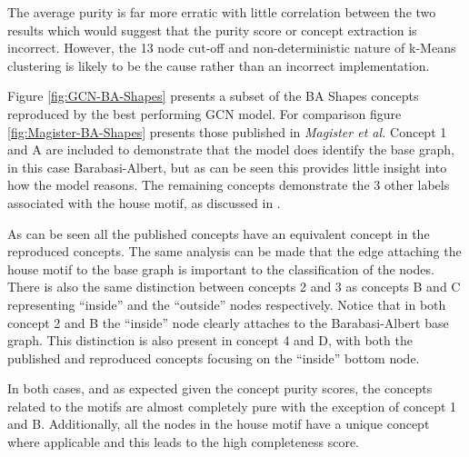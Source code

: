 The average purity is far more erratic with little correlation between the two results which would suggest that the purity score or concept extraction is incorrect.
However, the 13 node cut-off and non-deterministic nature of k-Means clustering is likely to be the cause rather than an incorrect implementation.



Figure \ref{fig:GCN-BA-Shapes} presents a subset of the BA Shapes concepts reproduced by the best performing GCN model.
For comparison figure \ref{fig:Magister-BA-Shapes} presents those published in \textit{Magister et al.}
Concept 1 and A are included to demonstrate that the model does identify the base graph, in this case Barabasi-Albert, but as can be seen this provides little insight into how the model reasons.
The remaining concepts demonstrate the 3 other labels associated with the house motif, as discussed in .

As can be seen all the published concepts have an equivalent concept in the reproduced concepts.
The same analysis can be made that the edge attaching the house motif to the base graph is important to the classification of the nodes.
There is also the same distinction between concepts 2 and 3 as concepts B and C representing ``inside'' and the ``outside'' nodes respectively.
Notice that in both concept 2 and B the  ``inside'' node clearly attaches to the Barabasi-Albert base graph.
This distinction is also present in concept 4 and D, with both the published and reproduced concepts focusing on the ``inside'' bottom node.

In both cases, and as expected given the concept purity scores, the concepts related to the motifs are almost completely pure with the exception of concept 1 and B.
Additionally, all the nodes in the house motif have a unique concept where applicable and this leads to the high completeness score.

